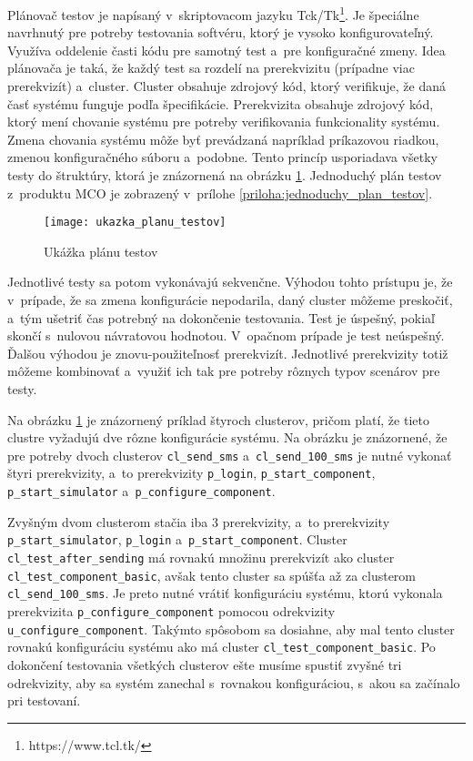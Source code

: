 Plánovač testov je napísaný v~skriptovacom jazyku Tck/Tk\footnote{https://www.tcl.tk/}. 
Je špeciálne navrhnutý pre potreby testovania softvéru, ktorý je vysoko 
konfigurovateľný. Využíva oddelenie časti kódu pre samotný test
a~pre konfiguračné zmeny. Idea plánovača je taká, že každý test sa 
rozdelí na prerekvizitu (prípadne viac prerekvizít) a~cluster. Cluster 
obsahuje zdrojový kód, ktorý verifikuje, že daná časť systému funguje 
podľa špecifikácie. Prerekvizita obsahuje zdrojový kód, ktorý mení 
chovanie systému pre potreby verifikovania funkcionality systému.
Zmena chovania systému môže byť prevádzaná napríklad príkazovou riadkou, 
zmenou konfiguračného súboru a~podobne.
Tento princíp usporiadava všetky testy do štruktúry, ktorá je znázornená 
na obrázku \ref{obrazok:ukazka_planu_testov}. Jednoduchý plán testov
z~produktu MCO je zobrazený v~prílohe \ref{priloha:jednoduchy_plan_testov}.

\begin{figure}[h]
  \begin{center}
    \texttt{[image: ukazka\_planu\_testov]}
    \caption{Ukážka plánu testov}
    \label{obrazok:ukazka_planu_testov}
  \end{center}
\end{figure}

Jednotlivé testy sa potom vykonávajú sekvenčne. Výhodou tohto prístupu 
je, že v~prípade, že sa zmena konfigurácie nepodarila, daný cluster 
môžeme preskočiť, a~tým ušetriť čas potrebný na dokončenie testovania. 
Test je úspešný, pokiaľ skončí s~nulovou návratovou hodnotou. 
V~opačnom prípade je test neúspešný.  
Ďalšou výhodou je znovu-použiteľnosť prerekvizít. 
Jednotlivé prerekvizity totiž môžeme kombinovať a~využiť ich tak pre 
potreby rôznych typov scenárov pre testy. 

Na obrázku \ref{obrazok:ukazka_planu_testov} je znázornený príklad štyroch 
clusterov, pričom platí, že tieto clustre vyžadujú dve rôzne konfigurácie
systému. 
Na obrázku je znázornené, že pre potreby dvoch clusterov \texttt{cl\_send\_sms}
a~\texttt{cl\_send\_100\_sms} je nutné vykonať štyri prerekvizity, a~to 
prerekvizity \texttt{p\_login}, \texttt{p\_start\_component}, 
\texttt{p\_start\_simulator} a~\texttt{p\_configure\_component}. 

Zvyšným dvom clusterom stačia iba 3 prerekvizity, a~to prerekvizity
\texttt{p\_start\_simulator}, \texttt{p\_login} 
a~\texttt{p\_start\_component}. Cluster \texttt{cl\_test\_after\_sending} 
má rovnakú množinu prerekvizít ako cluster \texttt{cl\_test\_component\_basic}, 
avšak tento cluster sa spúšťa až za clusterom \texttt{cl\_send\_100\_sms}. 
Je preto nutné vrátiť konfiguráciu systému, ktorú vykonala prerekvizita 
\texttt{p\_configure\_component} pomocou odrekvizity
\texttt{u\_configure\_component}. 
Takýmto spôsobom sa dosiahne, aby mal tento cluster rovnakú konfiguráciu 
systému ako má cluster \texttt{cl\_test\_component\_basic}.
Po dokončení testovania všetkých clusterov ešte musíme spustiť zvyšné tri
odrekvizity, aby sa systém zanechal s~rovnakou konfiguráciou, s~akou 
sa začínalo pri testovaní.

